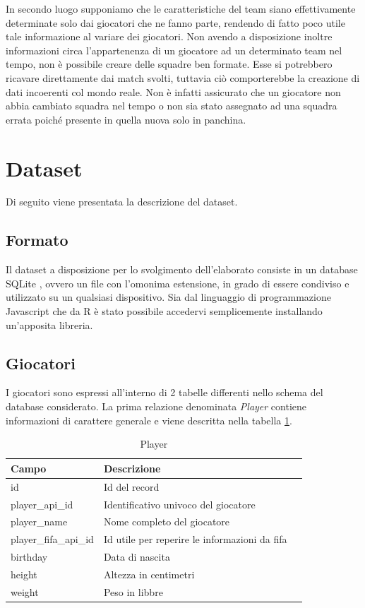 \documentclass[hidelinks, 12pt]{article}
\begin{document}
	In secondo luogo supponiamo che le caratteristiche del team siano effettivamente determinate solo dai giocatori che ne fanno parte, rendendo di fatto poco utile tale informazione al variare dei giocatori. Non avendo a disposizione inoltre informazioni circa l'appartenenza di un giocatore ad un determinato team nel tempo, non è possibile creare delle squadre ben formate. Esse si potrebbero ricavare direttamente dai match svolti, tuttavia ciò comporterebbe la creazione di dati incoerenti col mondo reale. Non è infatti assicurato che un giocatore non abbia cambiato squadra nel tempo o non sia stato assegnato ad una squadra errata poiché presente in quella nuova solo in panchina.
	
	
	\clearpage
	\section{Dataset}
	
	Di seguito viene presentata la descrizione del dataset.
	
	\subsection{Formato}
	
	Il dataset a disposizione per lo svolgimento dell'elaborato consiste in un database SQLite \cite{site:sqlite}, ovvero un file con l'omonima estensione, in grado di essere condiviso e utilizzato su un qualsiasi dispositivo. Sia dal linguaggio di programmazione Javascript che da R è stato possibile accedervi semplicemente installando un'apposita libreria.
	
	\subsection{Giocatori}
	
	I giocatori sono espressi all'interno di 2 tabelle differenti nello schema del database considerato. La prima relazione denominata {\it Player} contiene informazioni di carattere generale e viene descritta nella tabella \ref{tab:player}.
	
	\begin{table}[H]
		\caption{Player}\label{tab:player}
		\begin{tabular}{|l|l|l|}
			\hline
			Campo & Descrizione \\
			\hline
			id & Id del record \\
			player\_api\_id & Identificativo univoco del giocatore \\
			player\_name & Nome completo del giocatore \\
			player\_fifa\_api\_id & Id utile per reperire le informazioni da fifa \\
			birthday & Data di nascita \\
			height & Altezza in centimetri \\
			weight & Peso in libbre \\
			\hline
		\end{tabular}
	\end{table}
	
\end{document}
